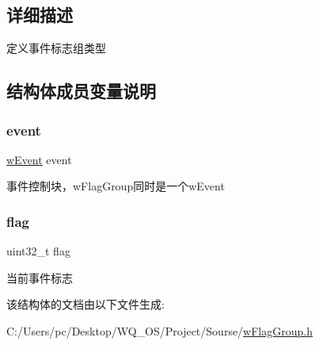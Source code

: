\subsection{详细描述}
定义事件标志组类型 

\subsection{结构体成员变量说明}
\mbox{\label{struct__w_flag_group_ad737d3f95a5cf9ee457f37f1cedfa44a}} 
\subsubsection{\texorpdfstring{event}{event}}
{\footnotesize\ttfamily \mbox{\hyperlink{w_event_8h_af8b15988a26e1ac0d63eaf3fc5afe9d3}{w\+Event}} event}

事件控制块，w\+Flag\+Group同时是一个w\+Event \mbox{\label{struct__w_flag_group_a8fac2498fe5bd106b35d43af5bc91f6f}} 
\subsubsection{\texorpdfstring{flag}{flag}}
{\footnotesize\ttfamily uint32\+\_\+t flag}

当前事件标志 

该结构体的文档由以下文件生成\+:\begin{DoxyCompactItemize}
\item 
C\+:/\+Users/pc/\+Desktop/\+W\+Q\+\_\+\+O\+S/\+Project/\+Sourse/\mbox{\hyperlink{w_flag_group_8h}{w\+Flag\+Group.\+h}}\end{DoxyCompactItemize}
